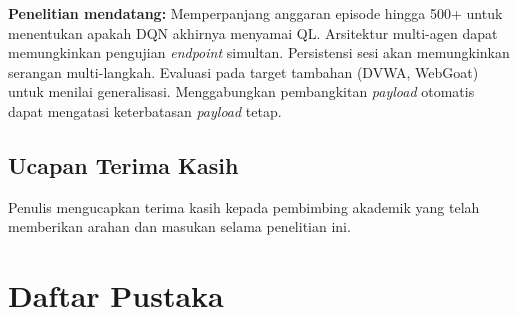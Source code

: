 \documentclass[a4paper,12pt]{article}
\begin{document}
\textbf{Penelitian mendatang:} Memperpanjang anggaran episode hingga 500+ untuk menentukan apakah DQN akhirnya menyamai QL. Arsitektur multi-agen dapat memungkinkan pengujian \textit{endpoint} simultan. Persistensi sesi akan memungkinkan serangan multi-langkah. Evaluasi pada target tambahan (DVWA, WebGoat) untuk menilai generalisasi. Menggabungkan pembangkitan \textit{payload} otomatis \cite{yao2023,alwahaibi2023} dapat mengatasi keterbatasan \textit{payload} tetap.

\subsection*{Ucapan Terima Kasih}

Penulis mengucapkan terima kasih kepada pembimbing akademik yang telah memberikan arahan dan masukan selama penelitian ini.

\section*{Daftar Pustaka}
\end{document}
